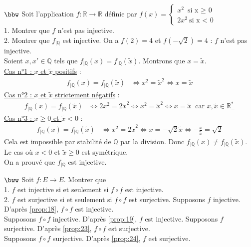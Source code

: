 \documentclass[11pt]{article}
\begin{document}
\begin{exercice}{$\bbw$}{}
    Soit l'application $f:\mathbb{R} \to \mathbb{R}$ définie par $f(x)=\begin{cases}x^2 ~ \text{si x $\geq$ 0} \\ 2x^2 ~ \text{si x < 0}\end{cases}$\\
    1. Montrer que $f$ n'est pas injective.\\
    2. Montrer que $f_{|\mathbb{Q}}$ est injective.
    \tcblower
     On a $f(2) = 4$ et $f(-\sqrt{2}) = 4$ : $f$ n'est pas injective.\\
     Soient $x,x'\in\mathbb{Q}$ tels que $f_{|\mathbb{Q}}(x)=f_{|\mathbb{Q}}(\widetilde{x})$. Montrons que $x=\widetilde{x}$.\\
    \underline{Cas n°1 : $x$ et $\widetilde{x}$ positifs} :
    \begin{align*}
        f_{|\mathbb{Q}}(x) = f_{|\mathbb{Q}}(\widetilde{x}) &\iff x^2 = \widetilde{x}^2 \iff x = \widetilde{x}
    \end{align*}
    \underline{Cas n°2 : $x$ et $\widetilde{x}$ strictement négatifs} :
    \begin{align*}
        f_{|\mathbb{Q}}(x) = f_{|\mathbb{Q}}(\widetilde{x}) &\iff 2x^2 = 2\widetilde{x}^2 \iff x^2 = \widetilde{x}^2 \iff x = \widetilde{x} ~ \text{ car $x,\widetilde{x}\in\mathbb{R}^*_-$}
    \end{align*}
    \underline{Cas n°3 : $x\geq0$ et $\widetilde{x}<0$} :
    \begin{align*}
        f_{|\mathbb{Q}}(x) = f_{|\mathbb{Q}}(\widetilde{x}) &\iff x^2 = 2\widetilde{x}^2 \iff x = -\sqrt{2}\widetilde{x} \iff -\frac{x}{\widetilde{x}}=\sqrt{2}
    \end{align*}
    Cela est impossible par stabilité de $\mathbb{Q}$ par la division. Donc $f_{|\mathbb{Q}}(x) \neq f_{|\mathbb{Q}}(\widetilde{x})$.\\
    Le cas où $x < 0$ et $\widetilde{x}\geq0$ est symétrique.\\
    On a prouvé que $f_{|\mathbb{Q}}$ est injective.
\end{exercice}

\begin{exercice}{$\bww$}{}
    Soit $f:E\to E$. Montrer que\\
    1. $f$ est injective si et seulement si $f \circ f$ est injective.\\
    2. $f$ est surjective si et seulement si $f \circ f$ est surjective.
    \tcblower
     Supposons $f$ injective. D'après \ref{prop:18}, $f \circ f$ est injective.\\
    Supposons $f \circ f$ injective. D'après \ref{prop:19}, $f$ est injective.\n
     Supposons $f$ surjective. D'après \ref{prop:23}, $f \circ f$ est surjective.\\
    Supposons $f \circ f$ surjective. D'après \ref{prop:24}, $f$ est surjective.
\end{exercice}
\end{document}
